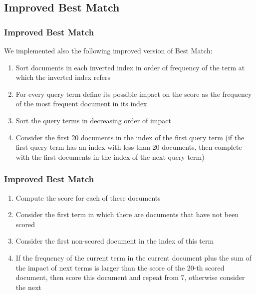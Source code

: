 \documentclass{beamer}
\begin{document}
\subsection{Improved Best Match}
\newcommand{\asuivre}{\setcounter{sauvegardeenumi}{\theenumi}}
\newcommand{\suite}{\setcounter{enumi}{\thesauvegardeenumi}}

\begin{frame}
\frametitle{Improved Best Match}
We implemented also the following improved version of Best Match:
\begin{enumerate}
	\item Sort documents in each inverted index in order of frequency of the term at which the inverted index refers
	\item For every query term define its possible impact on the score as the frequency of the most frequent document in its index
	\item Sort the query terms in decreasing order of impact
	\item Consider the first 20 documents in the index of the first query term (if the first query term has an index with less than 20 documents, then complete with the first documents in the index of the next query term)
	\asuivre
\end{enumerate}
\end{frame}

\begin{frame}
\frametitle{Improved Best Match}
\begin{enumerate}	
	\suite
	\item Compute the score for each of these documents
	\item Consider the first term in which there are documents that have not been scored
	\item Consider the first non-scored document in the index of this term
	\item If the frequency of the current term in the current document plus the sum of the impact of next terms is larger than the score of the 20-th scored document, then score this document and repeat from 7, otherwise consider the next    
\end{enumerate}
\end{frame}
\end{document}
